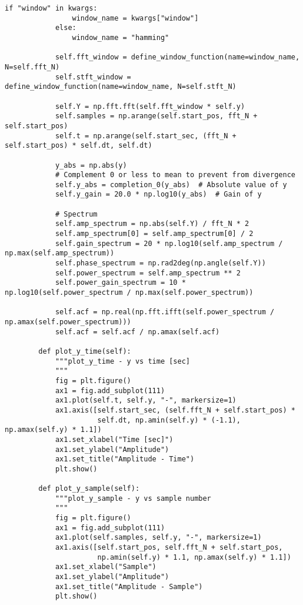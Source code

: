 \begin{lstlisting}[caption=plot\_tools.py,label=plot_tools.py]
            if "window" in kwargs:
                window_name = kwargs["window"]
            else:
                window_name = "hamming"
    
            self.fft_window = define_window_function(name=window_name, N=self.fft_N)
            self.stft_window = define_window_function(name=window_name, N=self.stft_N)
    
            self.Y = np.fft.fft(self.fft_window * self.y)
            self.samples = np.arange(self.start_pos, fft_N + self.start_pos)
            self.t = np.arange(self.start_sec, (fft_N + self.start_pos) * self.dt, self.dt)
    
            y_abs = np.abs(y)
            # Complement 0 or less to mean to prevent from divergence
            self.y_abs = completion_0(y_abs)  # Absolute value of y
            self.y_gain = 20.0 * np.log10(y_abs)  # Gain of y
    
            # Spectrum
            self.amp_spectrum = np.abs(self.Y) / fft_N * 2
            self.amp_spectrum[0] = self.amp_spectrum[0] / 2
            self.gain_spectrum = 20 * np.log10(self.amp_spectrum / np.max(self.amp_spectrum))
            self.phase_spectrum = np.rad2deg(np.angle(self.Y))
            self.power_spectrum = self.amp_spectrum ** 2
            self.power_gain_spectrum = 10 * np.log10(self.power_spectrum / np.max(self.power_spectrum))
    
            self.acf = np.real(np.fft.ifft(self.power_spectrum / np.amax(self.power_spectrum)))
            self.acf = self.acf / np.amax(self.acf)
    
        def plot_y_time(self):
            """plot_y_time - y vs time [sec]
            """
            fig = plt.figure()
            ax1 = fig.add_subplot(111)
            ax1.plot(self.t, self.y, "-", markersize=1)
            ax1.axis([self.start_sec, (self.fft_N + self.start_pos) *
                      self.dt, np.amin(self.y) * (-1.1), np.amax(self.y) * 1.1])
            ax1.set_xlabel("Time [sec]")
            ax1.set_ylabel("Amplitude")
            ax1.set_title("Amplitude - Time")
            plt.show()
    
        def plot_y_sample(self):
            """plot_y_sample - y vs sample number
            """
            fig = plt.figure()
            ax1 = fig.add_subplot(111)
            ax1.plot(self.samples, self.y, "-", markersize=1)
            ax1.axis([self.start_pos, self.fft_N + self.start_pos,
                      np.amin(self.y) * 1.1, np.amax(self.y) * 1.1])
            ax1.set_xlabel("Sample")
            ax1.set_ylabel("Amplitude")
            ax1.set_title("Amplitude - Sample")
            plt.show()
    

\end{lstlisting}

